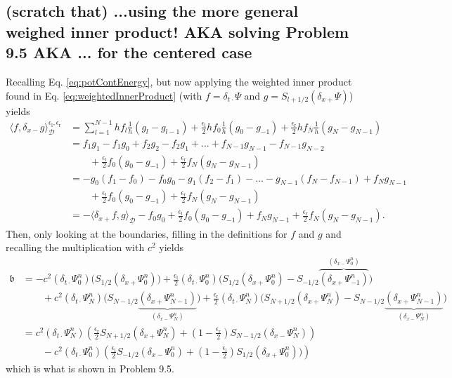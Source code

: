 \documentclass[dvipsnames]{article}
\def\dxp{\delta_{x+}}
\def\dxm{\delta_{x-}}
\def\dtd{\delta_{t\cdot}}
\begin{document}
\subsection{(scratch that) ...using the more general weighed inner product! AKA solving Problem 9.5 AKA ... for the centered case}\label{app:potDerivCent}
Recalling Eq. \eqref{eq:potContEnergy}, but now applying the weighted inner product found in Eq. \eqref{eq:weightedInnerProduct} (with $f=\dtd\Psi$ and $g = S_{l+1/2}(\dxp\Psi)$) yields
\begin{equation}
    \begin{aligned}
        \langle f,\dxm g \rangle_{\mathcal{D}}^{\epsilon_\text{l},\epsilon_\text{r}} &= \sum_{l=1}^{N-1} h f_l\frac{1}{h}(g_l-g_{l-1}) + \frac{\epsilon_\text{l}}{2}hf_0\frac{1}{h}(g_0 - g_{-1})+ \frac{\epsilon_\text{r}}{2}hf_N\frac{1}{h}(g_N - g_{N-1})\\
        &=f_1g_1-f_1g_0+f_2g_2-f_2g_1+\hdots+f_{N-1}g_{N-1}-f_{N-1}g_{N-2}\\
        &\qquad+ \frac{\epsilon_\text{l}}{2}f_0(g_0 - g_{-1}) + \frac{\epsilon_\text{r}}{2}f_N(g_N-g_{N-1})\\
        &= -g_0(f_1-f_0) - f_0g_0 - g_1(f_2-f_1) - \hdots - g_{N-1}(f_N - f_{N-1}) + f_Ng_{N-1}\\
        &\qquad + \frac{\epsilon_\text{l}}{2}f_0(g_0 - g_{-1}) + \frac{\epsilon_\text{r}}{2}f_N(g_N-g_{N-1})\\
        &= -\langle \dxp f, g\rangle_{\underline{\mathcal{D}}} - f_0g_0 + \frac{\epsilon_\text{l}}{2}f_0(g_0 - g_{-1}) + f_Ng_{N-1} + \frac{\epsilon_\text{r}}{2}f_N(g_N-g_{N-1}).
    \end{aligned}
\end{equation}
Then, only looking at the boundaries, filling in the definitions for $f$ and $g$ and recalling the multiplication with $c^2$ yields
\begin{equation}
    \begin{aligned}
    \mathfrak{b}  &=-c^2(\dtd\Psi_0^n)\Big(S_{1/2}(\dxp\Psi_0^n)\Big) +\frac{\epsilon_\text{l}}{2}(\dtd\Psi_0^n)\Big(S_{1/2}(\dxp\Psi_0^n)-S_{-1/2}\overbrace{(\dxp\Psi_{-1}^n)}^{(\dxm\Psi_0^n)}\Big) \\
    & \qquad +c^2 (\dtd\Psi_N^n)\Big(S_{N-1/2}\underbrace{(\dxp\Psi_{N-1}^n)}_{(\dxm\Psi_{N}^n)}\Big)+  \frac{\epsilon_\text{r}}{2}(\dtd\Psi_{N}^n)\Big(S_{N+1/2}(\dxp\Psi_N^n) - S_{N-1/2}\underbrace{(\dxp \Psi_{N-1}^n)}_{(\dxm\Psi_{N}^n)}\Big)\\
    &= c^2(\dtd\Psi_N^n)\left(\frac{\epsilon_\text{r}}{2}S_{N+1/2}(\dxp \Psi_N^n) + \left(1-\frac{\epsilon_\text{r}}{2}\right)S_{N-1/2}(\dxm\Psi_N^n)\right)\\
    &\qquad - c^2(\dtd\Psi_0^n)\left(\frac{\epsilon_\text{l}}{2}S_{-1/2}(\dxm\Psi_0^n)+\left(1-\frac{\epsilon_\text{l}}{2}\right)S_{1/2}(\dxp \Psi_0^n))\right)
    \end{aligned}
\end{equation}
which is what is shown in Problem 9.5. 
\end{document}
